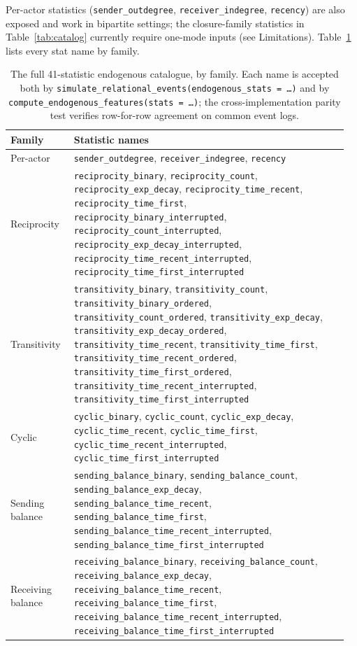 \documentclass[11pt,a4paper]{article}
\begin{document}
Per-actor statistics (\texttt{sender\_outdegree},
\texttt{receiver\_indegree}, \texttt{recency}) are also exposed and
work in bipartite settings; the closure-family statistics in
Table~\ref{tab:catalog} currently require one-mode inputs
(see Limitations). Table~\ref{tab:catalog-full} lists every stat
name by family.

\begin{table}[h]
\centering
\footnotesize
\begin{tabular}{p{0.18\linewidth} p{0.78\linewidth}}
\toprule
Family & Statistic names \\
\midrule
Per-actor &
\texttt{sender\_outdegree},
\texttt{receiver\_indegree},
\texttt{recency} \\[2pt]
Reciprocity &
\texttt{reciprocity\_binary},
\texttt{reciprocity\_count},
\texttt{reciprocity\_exp\_decay},
\texttt{reciprocity\_time\_recent},
\texttt{reciprocity\_time\_first},
\texttt{reciprocity\_binary\_interrupted},
\texttt{reciprocity\_count\_interrupted},
\texttt{reciprocity\_exp\_decay\_interrupted},
\texttt{reciprocity\_time\_recent\_interrupted},
\texttt{reciprocity\_time\_first\_interrupted} \\[2pt]
Transitivity &
\texttt{transitivity\_binary},
\texttt{transitivity\_count},
\texttt{transitivity\_binary\_ordered},
\texttt{transitivity\_count\_ordered},
\texttt{transitivity\_exp\_decay},
\texttt{transitivity\_exp\_decay\_ordered},
\texttt{transitivity\_time\_recent},
\texttt{transitivity\_time\_first},
\texttt{transitivity\_time\_recent\_ordered},
\texttt{transitivity\_time\_first\_ordered},
\texttt{transitivity\_time\_recent\_interrupted},
\texttt{transitivity\_time\_first\_interrupted} \\[2pt]
Cyclic &
\texttt{cyclic\_binary},
\texttt{cyclic\_count},
\texttt{cyclic\_exp\_decay},
\texttt{cyclic\_time\_recent},
\texttt{cyclic\_time\_first},
\texttt{cyclic\_time\_recent\_interrupted},
\texttt{cyclic\_time\_first\_interrupted} \\[2pt]
Sending balance &
\texttt{sending\_balance\_binary},
\texttt{sending\_balance\_count},
\texttt{sending\_balance\_exp\_decay},
\texttt{sending\_balance\_time\_recent},
\texttt{sending\_balance\_time\_first},
\texttt{sending\_balance\_time\_recent\_interrupted},
\texttt{sending\_balance\_time\_first\_interrupted} \\[2pt]
Receiving balance &
\texttt{receiving\_balance\_binary},
\texttt{receiving\_balance\_count},
\texttt{receiving\_balance\_exp\_decay},
\texttt{receiving\_balance\_time\_recent},
\texttt{receiving\_balance\_time\_first},
\texttt{receiving\_balance\_time\_recent\_interrupted},
\texttt{receiving\_balance\_time\_first\_interrupted} \\
\bottomrule
\end{tabular}
\caption{The full 41-statistic endogenous catalogue, by family.
Each name is accepted both by
\texttt{simulate\_relational\_events(endogenous\_stats = \dots)}
and by \texttt{compute\_endogenous\_features(stats = \dots)}; the
cross-implementation parity test verifies row-for-row agreement
on common event logs.}
\label{tab:catalog-full}
\end{table}
\end{document}
